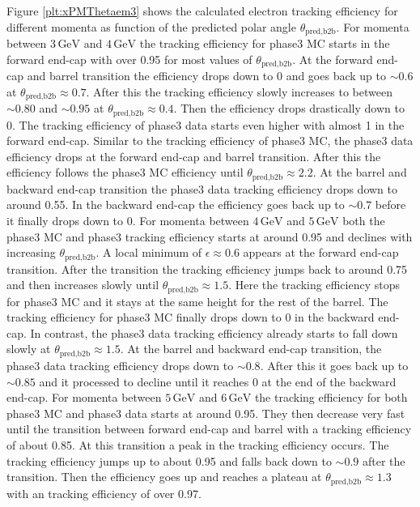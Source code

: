 \documentclass[a4paper,11pt,twosided,final,german,openbib,pdftex,listof=totoc,bibliography=totoc]{scrbook}
\begin{document}
Figure \ref{plt:xPMThetaem3} shows the calculated electron tracking efficiency for different momenta as function of the predicted polar angle $\theta_{\textrm{pred,b2b}}$.
For momenta between $3\,\textrm{GeV}$ and $4\,\textrm{GeV}$ the tracking efficiency for phase3 MC starts in the forward end-cap with over 0.95 for most values of $\theta_{\textrm{pred,b2b}}$. At the forward end-cap and barrel transition the efficiency drops down to 0 and goes back up to $\sim 0.6$ at $\theta_{\textrm{pred,b2b}} \approx 0.7$. After this the tracking efficiency slowly increases to between $\sim 0.80$ and $\sim 0.95$ at $\theta_{\textrm{pred,b2b}} \approx 0.4$. Then the efficiency drops drastically down to 0. The tracking efficiency of phase3 data starts even higher with almost 1 in the forward end-cap. Similar to the tracking efficiency of phase3 MC, the phase3 data efficiency drops at the forward end-cap and barrel transition. After this the efficiency follows the phase3 MC efficiency until $\theta_{\textrm{pred,b2b}} \approx 2.2$. At the barrel and backward end-cap transition the phase3 data tracking efficiency drops down to around 0.55. In the backward end-cap the efficiency goes back up to $\sim 0.7$ before it finally drops down to 0.
For momenta between $4\,\textrm{GeV}$ and $5\,\textrm{GeV}$ both the phase3 MC and phase3 tracking efficiency starts at around 0.95 and declines with increasing $\theta_{\textrm{pred,b2b}}$. A local minimum of $\epsilon \approx 0.6$ appears at the forward end-cap transition. After the transition the tracking efficiency jumps back to around 0.75 and then increases slowly until $\theta_{\textrm{pred,b2b}} \approx 1.5$. Here the tracking efficiency stops for phase3 MC and it stays at the same height for the rest of the barrel. The tracking efficiency for phase3 MC finally drops down to 0 in the backward end-cap. In contrast, the phase3 data tracking efficiency already starts to fall down slowly at $\theta_{\textrm{pred,b2b}} \approx 1.5$. At the barrel and backward end-cap transition, the phase3 data tracking efficiency drops down to $\sim 0.8$. After this it goes back up to $\sim 0.85$ and it processed to decline until it reaches 0 at the end of the backward end-cap.
For momenta between $5\,\textrm{GeV}$ and $6\,\textrm{GeV}$ the tracking efficiency for both phase3 MC and phase3 data starts at around 0.95. They then decrease very fast until the transition between forward end-cap and barrel with a tracking efficiency of about 0.85. At this transition a peak in the tracking efficiency occurs. The tracking efficiency jumps up to about 0.95 and falls back down to $\sim 0.9$ after the transition. Then the efficiency goes up and reaches a plateau at $\theta_{\textrm{pred,b2b}} \approx 1.3$ with an tracking efficiency of over 0.97.
\end{document}
